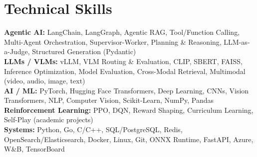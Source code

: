 \documentclass[letterpaper,11pt]{article}
\begin{document}
\section{Technical Skills}
\footnotesize
\textbf{Agentic AI:} LangChain, LangGraph, Agentic RAG, Tool/Function Calling, Multi-Agent Orchestration, Supervisor-Worker, Planning \& Reasoning, LLM-as-a-Judge, Structured Generation (Pydantic) \\[1pt]
\textbf{LLMs / VLMs:} vLLM, VLM Routing \& Evaluation, CLIP, SBERT, FAISS, Inference Optimization, Model Evaluation, Cross-Modal Retrieval, Multimodal (video, audio, image, text) \\[1pt]
\textbf{AI / ML:} PyTorch, Hugging Face Transformers, Deep Learning, CNNs, Vision Transformers, NLP, Computer Vision, Scikit-Learn, NumPy, Pandas \\[1pt]
\textbf{Reinforcement Learning:} PPO, DQN, Reward Shaping, Curriculum Learning, Self-Play (academic projects) \\[1pt]
\textbf{Systems:} Python, Go, C/C++, SQL/PostgreSQL, Redis, OpenSearch/Elasticsearch, Docker, Linux, Git, ONNX Runtime, FastAPI, Azure, W\&B, TensorBoard
\end{document}
